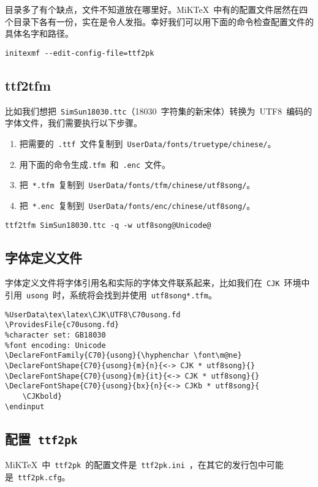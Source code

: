 目录多了有个缺点，文件不知道放在哪里好。MiKTeX~中有的配置文件居然在四个目录下各有一份，实在是令人发指。幸好我们可以用下面的命令检查配置文件的具体名字和路径。

\begin{lstlisting}
initexmf --edit-config-file=ttf2pk
\end{lstlisting}

\subsection{ttf2tfm}
比如我们想把~\verb|SimSun18030.ttc|（18030~字符集的新宋体）转换为~UTF8~编码的字体文件，我们需要执行以下步骤。

\begin{enumerate}
    \item 把需要的~\verb|.ttf|~文件复制到~\verb|UserData/fonts/truetype/chinese/|。
    \item 用下面的命令生成\verb|.tfm|~和~\verb|.enc|~文件。
    \item 把~\verb|*.tfm|~复制到~\verb|UserData/fonts/tfm/chinese/utf8song/|。
    \item 把~\verb|*.enc|~复制到~\verb|UserData/fonts/enc/chinese/utf8song/|。
\end{enumerate}

\begin{lstlisting}
ttf2tfm SimSun18030.ttc -q -w utf8song@Unicode@
\end{lstlisting}

\subsection{字体定义文件}
字体定义文件将字体引用名和实际的字体文件联系起来，比如我们在~\verb|CJK|~环境中引用~\verb|usong|~时，系统将会找到并使用~\verb|utf8song*.tfm|。

\begin{lstlisting}
%UserData\tex\latex\CJK\UTF8\C70usong.fd
\ProvidesFile{c70usong.fd}
%character set: GB18030
%font encoding: Unicode
\DeclareFontFamily{C70}{usong}{\hyphenchar \font\m@ne}
\DeclareFontShape{C70}{usong}{m}{n}{<-> CJK * utf8song}{}
\DeclareFontShape{C70}{usong}{m}{it}{<-> CJK * utf8song}{}
\DeclareFontShape{C70}{usong}{bx}{n}{<-> CJKb * utf8song}{
    \CJKbold}
\endinput
\end{lstlisting}

\subsection{配置~\texttt{ttf2pk}}
MiKTeX~中~\verb|ttf2pk|~的配置文件是~\verb|ttf2pk.ini|~，在其它的发行包中可能是~\verb|ttf2pk.cfg|。

